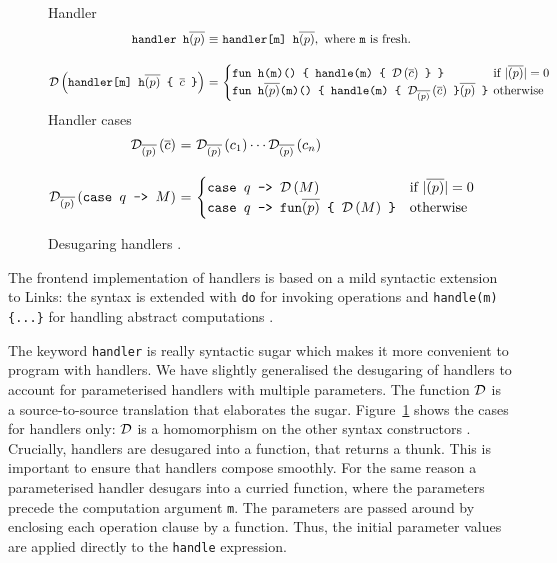 \documentclass[12pt,mscres,cdtppar,twoside,openright,logo,rightchapter,normalheadings]{infthesis}
\makeatletter
\theoremstyle{definition}
\newcommand{\linksify}[1]{\texttt{#1}}
\newcommand{\ba}{\begin{array}}
\newcommand{\ea}{\end{array}}
\newenvironment{eqs}{\ba{@{}r@{~}c@{~}l@{}}}{\ea}
\makeatother
\begin{document}
\begin{figure}
Handler
\hspace{-1cm}
\[
\begin{eqs}
\linksify{handler h$\vecc{(p)}$} &\equiv& \linksify{handler[m] h$\vecc{(p)}$}, \text{ where \linksify{m} is fresh.}
\vspace{5mm} \\
\desugar \left( \linksify{handler[m] h$\vecc{(p)}$ \{ $\vec{c}$ \}} \right) &=& 
\begin{cases} 
  \linksify{fun h(m)() \{ handle(m) \{ $\desugar \left( \vec{c} \right)$ \} \}} &\hspace{-2mm}\text{if } |\vecc{(p)}| = 0\\
  \linksify{fun h$\vecc{(p)}$(m)() \{ handle(m) \{ $\desugar_{\vecc{(p)}} \left( \vec{c} \right)$ \}$\vecc{(p)}$ \}} & \hspace{-2mm}\text{otherwise}
\end{cases}
\end{eqs}
\]
Handler cases
\[
\begin{eqs}
\desugar_{\vecc{(p)}} \left( \vec{c} \right) &=& \desugar_{\vecc{(p)}} \left( c_1 \right) \cdots \desugar_{\vecc{(p)}} \left( c_n \right)
\vspace{5mm} \\
\desugar_{\vecc{(p)}} \left(\linksify{case $q$ -> $M$} \right) &=&  
\begin{cases}
  \linksify{case $q$ -> $\desugar \left( M \right)$}                      & \text{if } |\vecc{(p)}| = 0\\
  \linksify{case $q$ -> fun$\vecc{(p)}$ \{ $\desugar \left( M \right)$ \}} & \text{otherwise}
\end{cases}
\end{eqs}
\]
\caption{Desugaring handlers \citep{Hillerstrom2016a}.}
\label{fig:handlers-desugaring}
\end{figure}
The frontend implementation of handlers is based on a mild syntactic
extension to Links: the syntax is extended with \lstinline$do$ for
invoking operations and \lstinline$handle(m) {...}$ for handling
abstract computations \citep{Hillerstrom2015}.

The keyword \lstinline$handler$ is really syntactic sugar which makes
it more convenient to program with handlers. We have slightly
generalised the desugaring of handlers to account for parameterised
handlers with multiple parameters. The function $\mathcal{D}$ is a
source-to-source translation that elaborates the
sugar. Figure~\ref{fig:handlers-desugaring} shows the cases for
handlers only: $\mathcal{D}$ is a homomorphism on the other syntax
constructors \citep{Hillerstrom2016a}.  Crucially, handlers are
desugared into a function, that returns a thunk. This is important to
ensure that handlers compose smoothly. For the same reason a
parameterised handler desugars into a curried function, where the
parameters precede the computation argument \lstinline$m$. The
parameters are passed around by enclosing each operation clause by a
function. Thus, the initial parameter values are applied directly to
the \lstinline$handle$ expression.
\end{document}
